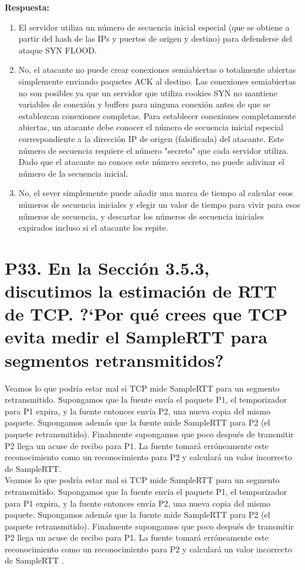 \documentclass[a4paper, 11pt]{article}
\theoremstyle{definition} \theoremstyle{remark}
\begin{document}
    \textbf{Respuesta:}
    \begin{enumerate}
      \item El servidor utiliza un n\'umero de secuencia inicial especial (que se obtiene a partir del hash de las IPs y puertos de origen y destino) para defenderse del ataque SYN FLOOD.
      \item No, el atacante no puede crear conexiones semiabiertas o totalmente abiertas simplemente enviando paquetes ACK al destino. Las conexiones semiabiertas no son posibles ya que un servidor que utiliza cookies SYN no mantiene variables de conexi\'on y buffers para ninguna conexi\'on antes de que se establezcan conexiones completas. Para establecer conexiones completamente abiertas, un atacante debe conocer el n\'umero de secuencia inicial especial correspondiente a la direcci\'on IP de origen (falsificada) del atacante. Este n\'umero de secuencia requiere el n\'umero "secreto" que cada servidor utiliza. Dado que el atacante no conoce este n\'umero secreto, no puede adivinar el n\'umero de la secuencia inicial.
      \item No, el sever simplemente puede a\~{n}adir una marca de tiempo al calcular esos n\'umeros de secuencia iniciales y elegir un valor de tiempo para vivir para esos n\'umeros de secuencia, y descartar los n\'umeros de secuencia iniciales expirados incluso si el atacante los repite.
    \end{enumerate}

    \section{P33. En la Secci\'on 3.5.3, discutimos la estimaci\'on de RTT de TCP. ?`Por qu\'e crees que TCP evita medir el SampleRTT para segmentos retransmitidos?}
    Veamos lo que podr\'ia estar mal si TCP mide SampleRTT para un segmento retransmitido. Supongamos que la fuente env\'ia el paquete P1, el temporizador para P1 expira, y la fuente entonces env\'ia P2, una nueva copia del mismo paquete. Supongamos adem\'as que la fuente mide SampleRTT para P2 (el paquete retransmitido). Finalmente supongamos que poco despu\'es de transmitir P2 llega un acuse de recibo para P1. La fuente tomar\'a err\'oneamente este reconocimiento como un reconocimiento para P2 y calcular\'a un valor incorrecto de SampleRTT.\\
    Veamos lo que podr\'ia estar mal si TCP mide SampleRTT para un segmento retransmitido. Supongamos que la fuente env\'ia el paquete P1, el temporizador para P1 expira, y la fuente entonces env\'ia P2, una nueva copia del mismo paquete. Supongamos adem\'as que la fuente mide SampleRTT para P2 (el paquete retransmitido). Finalmente supongamos que poco despu\'es de transmitir P2 llega un acuse de recibo para P1. La fuente tomar\'a err\'oneamente este reconocimiento como un reconocimiento para P2 y calcular\'a un valor incorrecto de SampleRTT .
\end{document}
